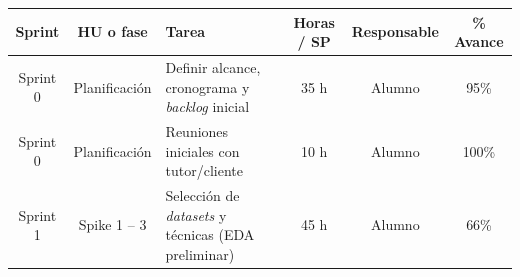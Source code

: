 \documentclass[
11pt, %
]{charter}
\begin{document}


\begin{table}[htpb]
\centering
\begin{tabularx}{\linewidth}{@{}|c|c|X|c|c|c|@{}}
\hline
\rowcolor[HTML]{C0C0C0}
Sprint & HU o fase & Tarea & Horas / SP & Responsable & \% Avance \\ \hline
Sprint 0 & Planificación & Definir alcance, cronograma y \textit{backlog} inicial & 35 h & Alumno & 95\% \\ \hline
Sprint 0 & Planificación & Reuniones iniciales con tutor/cliente & 10 h & Alumno & 100\% \\ \hline
Sprint 1 & Spike 1 – 3 & Selección de \textit{datasets} y técnicas (EDA preliminar) & 45 h & Alumno & 66\% \\ \hline

\end{tabularx}
\end{table}
\end{document}
